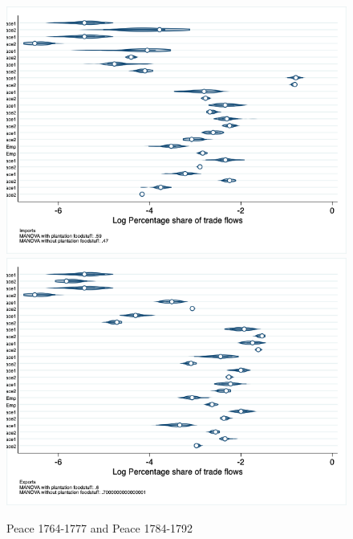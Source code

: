 \documentclass[12pt,a4paper,notitlepage,english]{article}
\begin{document}
\begin{figure}
\centering
\caption{Peace 1764-1777 and Peace 1784-1792}
\label{seven_peace1764_1777_nat_distr}
\includegraphics[scale=.4]{peace1764_1777_peace1784_1792_nat_distr_Ipays}
\includegraphics[scale=.4]{peace1764_1777_peace1784_1792_nat_distr_Xpays}
\end{figure}
\end{document}
